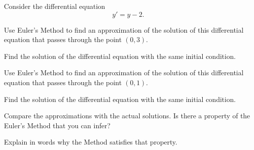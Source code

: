 \begin{lesson}

%	
%
%	
%
\end{lesson}




\newpage

\question
	Consider the differential equation
	$$ y' = y - 2 .$$
	
\begin{parts}
	\item Use Euler's Method to find an approximation of the solution of this differential equation that passes through the point $(0,3)$.
	\item Find the solution of the differential equation with the same initial condition.

	\item Use Euler's Method to find an approximation of the solution of this differential equation that passes through the point $(0,1)$.
	\item Find the solution of the differential equation with the same initial condition.

	\item Compare the approximations with the actual solutions. Is there a property of the Euler's Method that you can infer?
	\item Explain in words why the Method satisfies that property.
	

\end{parts}

